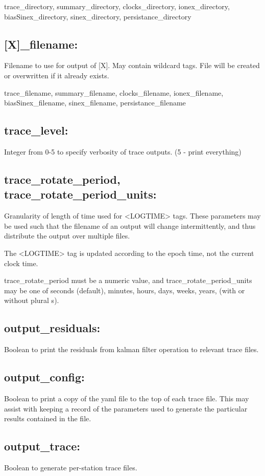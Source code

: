 trace\_directory, summary\_directory, clocks\_directory, ionex\_directory, biasSinex\_directory, sinex\_directory, persistance\_directory

\subsection{[X]\_filename:}
Filename to use for output of [X]. May contain wildcard tags. File will be created or overwritten if it already exists.

trace\_filename, summary\_filename, clocks\_filename, ionex\_filename, biasSinex\_filename, sinex\_filename, persistance\_filename

\subsection{trace\_level:}
Integer from 0-5 to specify verbosity of trace outputs. (5 - print everything)

\subsection{trace\_rotate\_period, trace\_rotate\_period\_units:}
Granularity of length of time used for <LOGTIME> tags. These parameters may be used such that the filename of an output will change intermittently, and thus distribute the output over multiple files.

The <LOGTIME> tag is updated according to the epoch time, not the current clock time.

trace\_rotate\_period must be a numeric value, and trace\_rotate\_period\_units may be one of seconds (default), minutes, hours, days, weeks, years, (with or without plural s).

\subsection{output\_residuals:}
Boolean to print the residuals from kalman filter operation to relevant trace files.

\subsection{output\_config:}
Boolean to print a copy of the yaml file to the top of each trace file. This may assist with keeping a record of the parameters used to generate the particular results contained in the file.

\subsection{output\_trace:}
Boolean to generate per-station trace files.

